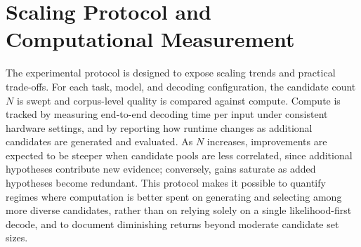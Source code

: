 \section{Scaling Protocol and Computational Measurement}

The experimental protocol is designed to expose scaling trends and practical trade-offs. For each task, model, and decoding configuration, the candidate count \(N\) is swept and corpus-level quality is compared against compute. Compute is tracked by measuring end-to-end decoding time per input under consistent hardware settings, and by reporting how runtime changes as additional candidates are generated and evaluated. As \(N\) increases, improvements are expected to be steeper when candidate pools are less correlated, since additional hypotheses contribute new evidence; conversely, gains saturate as added hypotheses become redundant. This protocol makes it possible to quantify regimes where computation is better spent on generating and selecting among more diverse candidates, rather than on relying solely on a single likelihood-first decode, and to document diminishing returns beyond moderate candidate set sizes.
